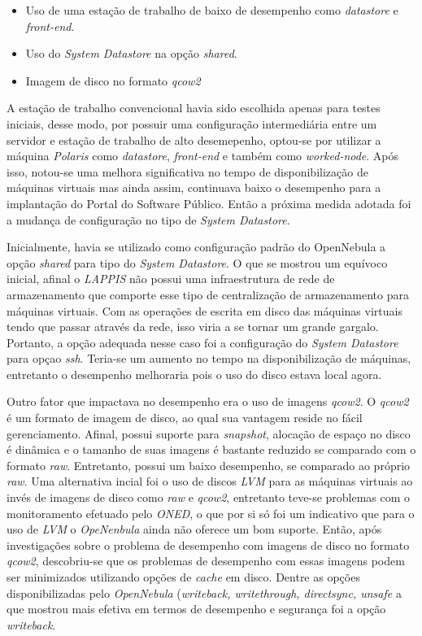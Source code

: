 \begin{apendicesenv}
\begin{itemize}
\item Uso de uma estação de trabalho de baixo de desempenho como \textit{datastore} e \textit{front-end}.
\item Uso do \textit{System Datastore} na opção \textit{shared}.
\item Imagem de disco no formato \textit{qcow2}
\end{itemize}

A estação de trabalho convencional havia sido escolhida apenas para testes iniciais, desse modo, por possuir uma configuração intermediária entre um servidor e estação de trabalho de alto desemepenho, optou-se por utilizar a máquina \textit{Polaris} como \textit{datastore}, \textit{front-end} e também como \textit{worked-node}. Após isso, notou-se uma melhora significativa no tempo de disponibilização de máquinas virtuais mas ainda assim, continuava baixo o desempenho para a implantação do Portal do Software Público. Então a próxima medida adotada foi a mudança de configuração no tipo de \textit{System Datastore}. 

Inicialmente, havia se utilizado como configuração padrão do OpenNebula a opção \textit{shared} para tipo do \textit{System Datastore}. O que se mostrou um equívoco inicial, afinal o \textit{LAPPIS} não possui uma infraestrutura de rede de armazenamento que comporte esse tipo de centralização de armazenamento para máquinas virtuais. Com as operações de escrita em disco das máquinas virtuais tendo que passar através da rede, isso viria a se tornar um grande gargalo. Portanto, a opção adequada nesse caso foi a configuração do \textit{System Datastore} para opçao \textit{ssh}. Teria-se um aumento no tempo na disponibilização de máquinas, entretanto o desempenho melhoraria pois o uso do disco estava local agora. 

Outro fator que impactava no desempenho era o uso de imagens \textit{qcow2}. O \textit{qcow2} é um formato de imagem de disco, ao qual sua vantagem reside no fácil gerenciamento. Afinal, possui suporte para \textit{snapshot}, alocação de espaço no disco é dinâmica e o tamanho de suas imagens é bastante reduzido se comparado com o formato \textit{raw}. Entretanto, possui um baixo desempenho, se comparado ao  próprio \textit{raw}. Uma alternativa incial foi o uso de discos \textit{LVM} para as máquinas virtuais ao invés de imagens de disco como \textit{raw} e \textit{qcow2}, entretanto teve-se problemas com o monitoramento efetuado pelo \textit{ONED}, o que por si só foi um indicativo que para o uso de \textit{LVM} o \textit{OpeNenbula} ainda não oferece um bom suporte. Então, após investigações sobre o problema de desempenho com imagens de disco no formato \textit{qcow2}, descobriu-se que os problemas de desempenho com essas imagens podem ser minimizados utilizando opções de \textit{cache} em disco. Dentre as opções disponibilizadas pelo \textit{OpenNebula} (\textit{writeback, writethrough, directsync, unsafe} a que mostrou mais efetiva em termos de desempenho e segurança foi a opção \textit{writeback}.


\end{apendicesenv}
